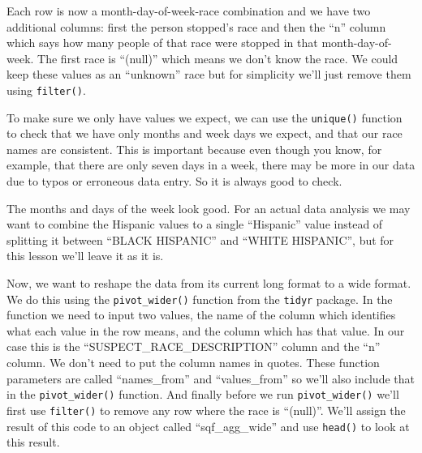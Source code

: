 \documentclass[
]{krantz}
\makeatletter
\newenvironment{Shaded}{\begin{snugshade}}{\end{snugshade}}
\newcommand{\CommentTok}[1]{\textcolor[rgb]{0.37,0.37,0.37}{\textit{#1}}}
\newcommand{\FunctionTok}[1]{\textcolor[rgb]{0,0,0}{#1}}
\newcommand{\NormalTok}[1]{#1}
\newcommand{\SpecialCharTok}[1]{\textcolor[rgb]{0,0,0}{#1}}
\newenvironment{kframe}{%
\medskip{}
\setlength{\fboxsep}{.8em}
 \def\at@end@of@kframe{}%
 \ifinner\ifhmode%
  \def\at@end@of@kframe{\end{minipage}}%
  \begin{minipage}{\columnwidth}%
 \fi\fi%
 \def\FrameCommand##1{\hskip\@totalleftmargin \hskip-\fboxsep
 \colorbox{shadecolor}{##1}\hskip-\fboxsep
     \hskip-\linewidth \hskip-\@totalleftmargin \hskip\columnwidth}%
 \MakeFramed {\advance\hsize-\width
   \@totalleftmargin\z@ \linewidth\hsize
   \@setminipage}}%
 {\par\unskip\endMakeFramed%
 \at@end@of@kframe}
\renewenvironment{Shaded}{\begin{kframe}}{\end{kframe}}
\makeatother
\begin{document}
Each row is now a month-day-of-week-race combination and we
have two additional columns: first the person stopped's race
and then the ``n'' column which says how many people of that
race were stopped in that month-day-of-week. The first race
is ``(null)'' which means we don't know the race. We could
keep these values as an ``unknown'' race but for simplicity
we'll just remove them using \texttt{filter()}.

To make sure we only have values we expect, we can use the
\texttt{unique()} function to check that we have only months
and week days we expect, and that our race names are
consistent. This is important because even though you know,
for example, that there are only seven days in a week, there
may be more in our data due to typos or erroneous data
entry. So it is always good to check.

\begin{Shaded}
\end{Shaded}

The months and days of the week look good. For an actual
data analysis we may want to combine the Hispanic values to
a single ``Hispanic'' value instead of splitting it between
``BLACK HISPANIC'' and ``WHITE HISPANIC'', but for this
lesson we'll leave it as it is.

Now, we want to reshape the data from its current long
format to a wide format. We do this using the
\texttt{pivot\_wider()} function from the \texttt{tidyr}
package. In the function we need to input two values, the
name of the column which identifies what each value in the
row means, and the column which has that value. In our case
this is the ``SUSPECT\_RACE\_DESCRIPTION'' column and the
``n'' column. We don't need to put the column names in
quotes. These function parameters are called ``names\_from''
and ``values\_from'' so we'll also include that in the
\texttt{pivot\_wider()} function. And finally before we run
\texttt{pivot\_wider()} we'll first use \texttt{filter()} to
remove any row where the race is ``(null)''. We'll assign
the result of this code to an object called
``sqf\_agg\_wide'' and use \texttt{head()} to look at this
result.
\end{document}
